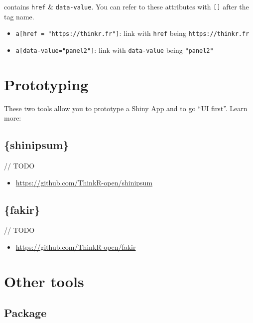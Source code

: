 \documentclass[]{book}
\providecommand{\tightlist}{%
  \setlength{\itemsep}{0pt}\setlength{\parskip}{0pt}}
\begin{document}
contains \texttt{href} \& \texttt{data-value}. You can refer to these attributes with \texttt{{[}{]}} after the tag name.

\begin{itemize}
\item
  \texttt{a{[}href\ =\ "https://thinkr.fr"{]}}: link with \texttt{href} being \texttt{https://thinkr.fr}
\item
  \texttt{a{[}data-value="panel2"{]}}: link with \texttt{data-value} being \texttt{"panel2"}
\end{itemize}

\hypertarget{proto}{%
\chapter{Prototyping}\label{proto}}

These two tools allow you to prototype a Shiny App and to go ``UI first''. Learn more:

\hypertarget{shinipsum}{%
\section{\{shinipsum\}}\label{shinipsum}}

// TODO

\begin{itemize}
\tightlist
\item
  \url{https://github.com/ThinkR-open/shinipsum}
\end{itemize}

\hypertarget{fakir}{%
\section{\{fakir\}}\label{fakir}}

// TODO

\begin{itemize}
\tightlist
\item
  \url{https://github.com/ThinkR-open/fakir}
\end{itemize}

\hypertarget{tooling}{%
\chapter{Other tools}\label{tooling}}

\hypertarget{package}{%
\section{Package}\label{package}}
\end{document}
